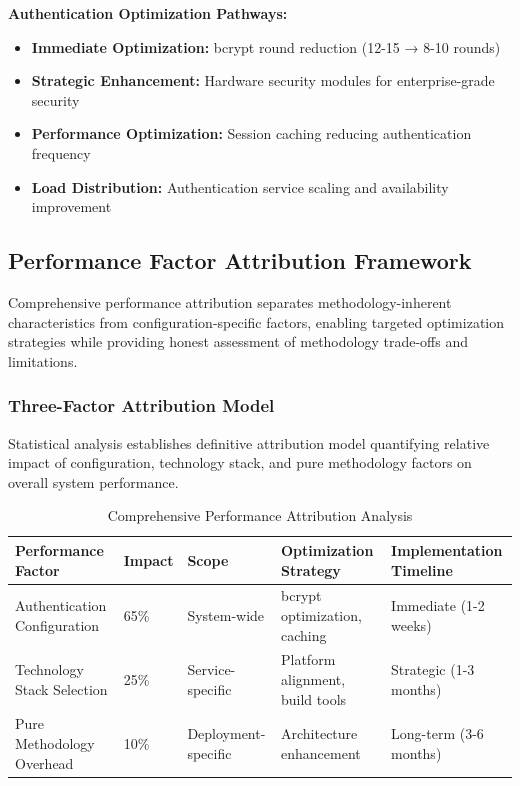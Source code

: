 \textbf{Authentication Optimization Pathways:}
\begin{itemize}
\item \textbf{Immediate Optimization:} bcrypt round reduction (12-15 → 8-10 rounds)
\item \textbf{Strategic Enhancement:} Hardware security modules for enterprise-grade security
\item \textbf{Performance Optimization:} Session caching reducing authentication frequency
\item \textbf{Load Distribution:} Authentication service scaling and availability improvement
\end{itemize}

\subsection{Performance Factor Attribution Framework}
\label{subsec:performance_factors}

Comprehensive performance attribution separates methodology-inherent characteristics from configuration-specific factors, enabling targeted optimization strategies while providing honest assessment of methodology trade-offs and limitations.

\subsubsection{Three-Factor Attribution Model}

Statistical analysis establishes definitive attribution model quantifying relative impact of configuration, technology stack, and pure methodology factors on overall system performance.

\begin{table}[H]
\centering
\caption{Comprehensive Performance Attribution Analysis}
\label{tab:performance_attribution_detailed}
\begin{tabular}{|p{4cm}|p{2cm}|p{2.5cm}|p{4cm}|p{3cm}|}
\hline
\textbf{Performance Factor} & \textbf{Impact} & \textbf{Scope} & \textbf{Optimization Strategy} & \textbf{Implementation Timeline} \\
\hline
Authentication Configuration & 65\% & System-wide & bcrypt optimization, caching & Immediate (1-2 weeks) \\
\hline
Technology Stack Selection & 25\% & Service-specific & Platform alignment, build tools & Strategic (1-3 months) \\
\hline
Pure Methodology Overhead & 10\% & Deployment-specific & Architecture enhancement & Long-term (3-6 months) \\
\hline
\end{tabular}
\end{table}


